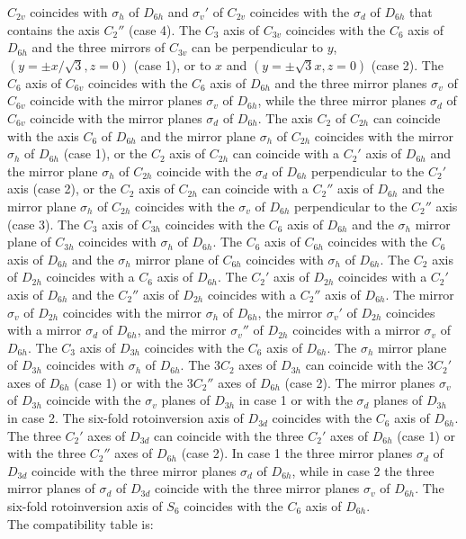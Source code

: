 \documentclass[12pt,a4paper,twoside]{report}
\begin{document}
$C_{2v}$ coincides with $\sigma_h$ of $D_{6h}$ and $\sigma_v'$ of
$C_{2v}$ coincides with the $\sigma_d$ of $D_{6h}$ that contains the axis 
$C_2''$ (case 4). The $C_3$ axis of $C_{3v}$ coincides with the $C_6$ axis of
$D_{6h}$ and the three mirrors of $C_{3v}$ can be perpendicular to $y$, 
$(y=\pm x/\sqrt{3}, z=0)$ (case 1), or to $x$ and $(y=\pm \sqrt{3} x, z=0)$
(case 2). The $C_6$ axis of $C_{6v}$ coincides with the $C_6$ axis of
$D_{6h}$ and the three mirror planes $\sigma_v$ of $C_{6v}$ coincide with the
mirror planes $\sigma_v$ of $D_{6h}$, while the three mirror planes
$\sigma_d$ of $C_{6v}$ coincide with the mirror planes $\sigma_d$ of 
$D_{6h}$. The axis $C_2$ of $C_{2h}$ can coincide with the axis $C_6$
of $D_{6h}$ and the mirror plane $\sigma_h$ of $C_{2h}$ coincides with
the mirror $\sigma_h$ of $D_{6h}$ (case 1), or the $C_2$ axis of 
$C_{2h}$ can coincide with a $C_2'$ axis of $D_{6h}$ and the mirror
plane $\sigma_h$ of $C_{2h}$ coincide with the $\sigma_d$ of $D_{6h}$
perpendicular to the $C_2'$ axis (case 2), or the $C_2$ axis of
$C_{2h}$ can coincide with a $C_2''$ axis of $D_{6h}$ and the
mirror plane $\sigma_h$ of $C_{2h}$ coincides with the $\sigma_v$ of $D_{6h}$ 
perpendicular to the $C_2''$ axis (case 3). The $C_3$ axis of $C_{3h}$
coincides with the $C_6$ axis of $D_{6h}$ and the $\sigma_h$ mirror plane
of $C_{3h}$ coincides with $\sigma_h$ of $D_{6h}$.
The $C_6$ axis of $C_{6h}$ coincides with the $C_6$ axis of $D_{6h}$ 
and the $\sigma_h$ mirror plane
of $C_{6h}$ coincides with $\sigma_h$ of $D_{6h}$.
The $C_2$ axis of $D_{2h}$ coincides with a $C_6$ axis of $D_{6h}$. The $C_2'$ 
axis of $D_{2h}$ coincides with a $C_2'$ axis of $D_{6h}$ and the $C_2''$ axis of 
$D_{2h}$ coincides with a $C_2''$ axis of $D_{6h}$. The mirror $\sigma_v$ of 
$D_{2h}$ coincides with the mirror $\sigma_h$ of $D_{6h}$, the mirror $\sigma_v'$ 
of $D_{2h}$ coincides with a mirror $\sigma_d$ of $D_{6h}$, and the mirror
$\sigma_v''$ of $D_{2h}$ coincides with a mirror $\sigma_v$ of $D_{6h}$. 
The $C_3$ axis of $D_{3h}$ coincides with the $C_6$ axis of $D_{6h}$.
The $\sigma_h$ mirror plane of $D_{3h}$ coincides with $\sigma_h$ 
of $D_{6h}$. The $3C_2$ axes of $D_{3h}$ can coincide with the
$3C_2'$ axes of $D_{6h}$ (case 1) or with the $3C_2''$ axes of $D_{6h}$ 
(case 2). The mirror planes $\sigma_v$ of $D_{3h}$ coincide with the 
$\sigma_v$ planes of $D_{3h}$ in case 1 or with the $\sigma_d$ planes of 
$D_{3h}$ in case 2. The six-fold rotoinversion axis of $D_{3d}$ coincides with the 
$C_6$ axis of $D_{6h}$. The three $C_2'$ axes of $D_{3d}$ can coincide
with the three $C_2'$ axes of $D_{6h}$ (case 1) or with the three $C_2''$ 
axes of $D_{6h}$ (case 2). In case 1 the three mirror planes $\sigma_d$
of $D_{3d}$ coincide with the three mirror planes $\sigma_d$ of $D_{6h}$, 
while in case 2 the three mirror planes of $\sigma_d$
of $D_{3d}$ coincide with the three mirror planes $\sigma_v$ of $D_{6h}$.
The six-fold rotoinversion axis of $S_6$ coincides with the $C_6$ axis of $D_{6h}$.
\\
The compatibility table is:
\end{document}
